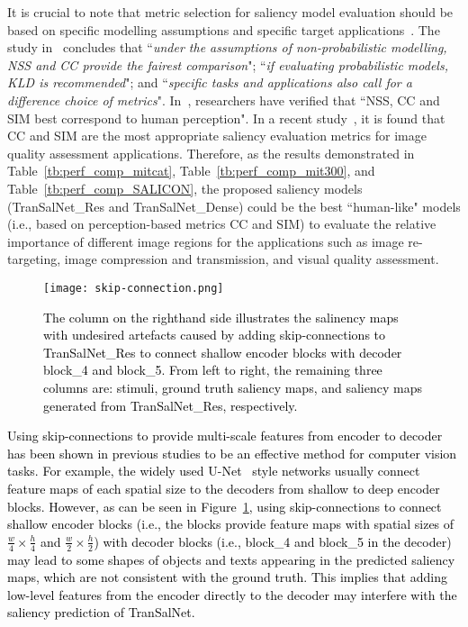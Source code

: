 \documentclass{article}
\begin{document}
It is crucial to note that metric selection for saliency model evaluation should be based on specific modelling assumptions and specific target applications~\cite{Bylinskii_2019}. The study in~\cite{Bylinskii_2019} concludes that ``\textit{under the assumptions of non-probabilistic modelling, NSS and CC provide the fairest comparison}"; ``\textit{if evaluating probabilistic models, KLD is recommended}"; and ``\textit{specific tasks and applications also call for a difference choice of metrics}". In~\cite{LIJ}, researchers have verified that ``NSS, CC and SIM best correspond to human perception". In a recent study~\cite{xiaohan}, it is found that CC and SIM are the most appropriate saliency evaluation metrics for image quality assessment applications. Therefore, as the results demonstrated in Table~\ref{tb:perf_comp_mitcat}, Table~\ref{tb:perf_comp_mit300}, and Table~\ref{tb:perf_comp_SALICON}, the proposed saliency models (TranSalNet\_Res and TranSalNet\_Dense) could be the best ``human-like" models (i.e., based on perception-based metrics CC and SIM) to evaluate the relative importance of different image regions for the applications such as image re-targeting, image compression and transmission, and visual quality assessment.

\begin{figure}
\centering
\texttt{[image: skip-connection.png]}
\caption{\textcolor{black}{The column on the righthand side illustrates the salinency maps with undesired artefacts caused by adding skip-connections to TranSalNet\_Res to connect shallow encoder blocks with decoder block\_4 and block\_5. From left to right, the remaining three columns are: stimuli, ground truth saliency maps, and saliency maps generated from TranSalNet\_Res, respectively. }}
\label{fig:sc}
\end{figure}

\textcolor{black}{Using skip-connections to provide multi-scale features from encoder to decoder has been shown in previous studies to be an effective method for computer vision tasks. For example, the widely used U-Net~\cite{unet} style networks usually connect feature maps of each spatial size to the decoders from shallow to deep encoder blocks. However, as can be seen in Figure~\ref{fig:sc}, using skip-connections to connect shallow encoder blocks (i.e., the blocks provide feature maps with spatial sizes of $\frac{w}{4}\times\frac{h}{4}$ and $\frac{w}{2}\times\frac{h}{2}$) with decoder blocks (i.e., block\_4 and block\_5 in the decoder) may lead to some shapes of objects and texts appearing in the predicted saliency maps, which are not consistent with the ground truth. This implies that adding low-level features from the encoder directly to the decoder may interfere with the saliency prediction of TranSalNet.}
\end{document}
